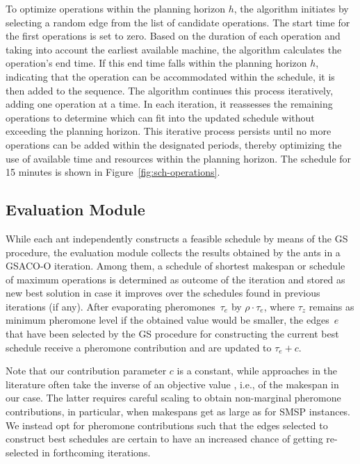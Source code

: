 To optimize operations within the planning horizon $h$, the algorithm initiates by selecting a random edge from the list of candidate operations. The start time for the first operations is set to zero. Based on the duration of each operation and taking into account the earliest available machine, the algorithm calculates the operation's end time. If this end time falls within the planning horizon $h$, indicating that the operation can be accommodated within the schedule, it is then added to the sequence. The algorithm continues this process iteratively, adding one operation at a time. In each iteration, it reassesses the remaining operations to determine which can fit into the updated schedule without exceeding the planning horizon. This iterative process persists until no more operations can be added within the designated periods, thereby optimizing the use of available time and resources within the planning horizon.
The schedule for 15 minutes is shown in Figure~\ref{fig:sch-operations}.

\subsection{Evaluation Module}
While each ant independently constructs a feasible schedule by means of the
GS procedure, the evaluation module collects the results obtained
by the ants in a GSACO-O iteration.
Among them, a schedule of shortest makespan or schedule of maximum operations is determined as outcome of the
iteration and stored as new best solution in case it improves over the schedules found in previous iterations (if any).
After evaporating pheromones~$\tau_e$ by $\rho\cdot\tau_e$,
where $\tau_z$ remains as minimum pheromone level if the obtained value
would be smaller,
the edges~$e$ that have been selected by the GS procedure for constructing the current best schedule receive a pheromone contribution and are updated to $\tau_e+c$.

Note that our contribution parameter $c$ is a constant,
while approaches in the literature often take the inverse of an objective value
\cite{turkyilmaz2020research}, i.e., of the makespan in our case.
The latter requires careful scaling to obtain non-marginal
pheromone contributions, in particular, when makespans get as large
as for SMSP instances.
We instead opt for pheromone contributions such that the
edges selected to construct best schedules are certain to have an increased chance
of getting re-selected in forthcoming iterations.

